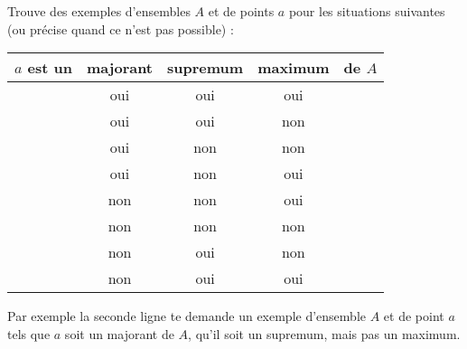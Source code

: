 

\begin{exercice}\label{exo207}

Trouve des exemples d'ensembles $A$ et de points $a$ pour les situations suivantes (ou précise quand ce n'est pas possible) :
\begin{center}
\begin{tabular}{l|c|c|c|r}
$a$ est un	&	majorant&	supremum	&	maximum	& de $A$\\\hline
		&	oui	&	oui		&	oui	\\ 
		&	oui	&	oui		&	non	\\ 
		&	oui	&	non		&	non	\\ 
		&	oui	&	non		&	oui	\\ 
		&	non	&	non		&	oui	\\ 
		&	non	&	non		&	non	\\ 
		&	non	&	oui		&	non	\\ 
		&	non	&	oui		&	oui	\\ 
\end{tabular}
\end{center}
Par exemple la seconde ligne te demande un exemple d'ensemble $A$ et de point $a$ tels que $a$ soit un majorant de $A$, qu'il soit un supremum, mais pas un maximum.
\end{exercice}
